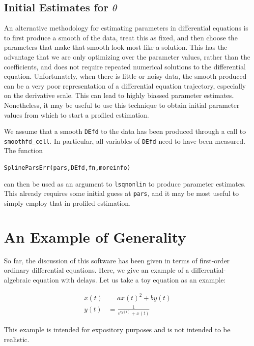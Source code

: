 \documentclass{article}
\newcommand{\nt}    {\noindent}
\begin{document}
\subsection{Initial Estimates for $\theta$}

An alternative methodology for estimating parameters in
differential equations is to first produce a smooth of the
data, treat this as fixed, and then choose the parameters
that make that smooth look most like a solution. This has
the advantage that we are only optimizing over the
parameter values, rather than the coefficients, and does
not require repeated numerical solutions to the
differential equation. Unfortunately, when there is little
or noisy data, the smooth produced can be a very poor
representation of a differential equation trajectory, especially
on the derivative scale. This can lead to highly biassed
parameter estimates. Nonetheless, it may be useful to use
this technique to obtain initial parameter values from
which to start a profiled estimation.

We assume that a smooth {\tt DEfd} to the data has been produced through a call to {\tt
smoothfd\_cell}. In particular, all variables of {\tt DEfd} need to have been measured. The
function

\begin{alltt}
   SplineParsErr(pars,DEfd,fn,moreinfo)
\end{alltt}

\nt can then be used as an argument to {\tt lsqnonlin} to
produce parameter estimates. This already requires some
initial guess at {\tt pars}, and it may be most useful to
simply employ that in profiled estimation.

\section{An Example of Generality} \label{example2}

So far, the discussion of this software has been given in
terms of first-order ordinary differential equations. Here,
we give an example of a differential-algebraic equation
with delays. Let us take a toy equation as an example:

\begin{align*}
\ddot{x}(t) & = a x(t)^2 + b y(t) \\
y(t) & = \frac{1}{e^{cy(t)} + x(t)}
\end{align*}

\nt This example is intended for expository purposes and is
not intended to be realistic.
\end{document}
